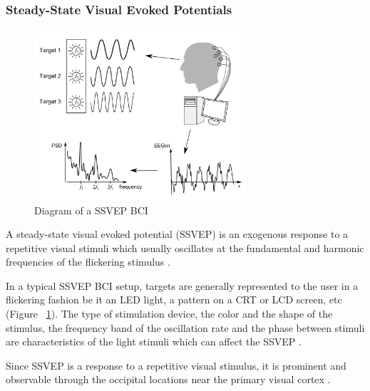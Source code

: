 \documentclass[12pt]{article}
\newcommand\mysubsubsection[1]{\subsubsection{#1}}
\numberwithin{equation}{section}
\numberwithin{figure}{section}
\numberwithin{table}{section}
\begin{document}
\newpage
\mysubsubsection{Steady-State Visual Evoked Potentials}
\par{
    \begin{figure}[ht]
        \centering
        \includegraphics[width=0.7\textwidth]{images/ssvep_flow}
        \caption[Diagram of a SSVEP BCI]{Diagram of a SSVEP BCI \citep{chumerin_decoding_2012}}
        \label{fig:eeg_ssvep_bci}
    \end{figure}
    A steady-state visual evoked potential (SSVEP) is an exogenous response
    to a repetitive visual stimuli which usually oscillates at the fundamental
    and harmonic frequencies of the flickering stimulus \citep{wu_stimulator_2008}.
}
\par{
    In a typical SSVEP BCI setup, targets are generally represented to the user
    in a flickering fashion be it an LED light, a pattern on a CRT or LCD screen, etc (Figure ~\ref{fig:eeg_ssvep_bci}).
    The type of stimulation device, the color and the shape of the stimulus,
    the frequency band of the oscillation rate and the phase between stimuli
    are characteristics of the light stimuli which can affect the SSVEP \citep{zhu_survey_2010}.
}
\par{
    Since SSVEP is a response to a repetitive visual stimulus, it is prominent
    and observable through the occipital locations near the primary visual
    cortex \citep{herrmann_human_2001}.
}

\newpage
\end{document}
